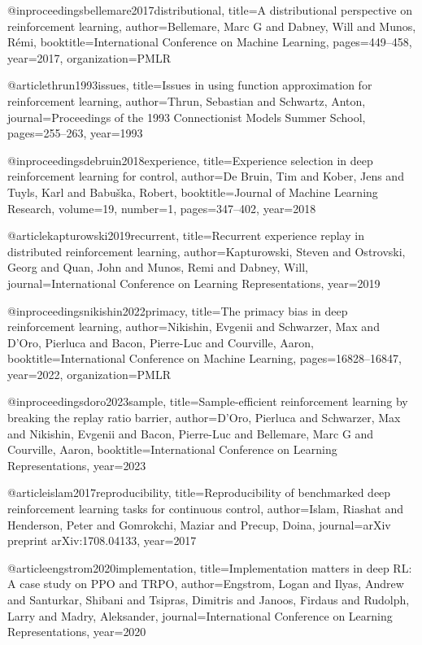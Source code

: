 @inproceedings{bellemare2017distributional,
  title={A distributional perspective on reinforcement learning},
  author={Bellemare, Marc G and Dabney, Will and Munos, R{\'e}mi},
  booktitle={International Conference on Machine Learning},
  pages={449--458},
  year={2017},
  organization={PMLR}
}

@article{thrun1993issues,
  title={Issues in using function approximation for reinforcement learning},
  author={Thrun, Sebastian and Schwartz, Anton},
  journal={Proceedings of the 1993 Connectionist Models Summer School},
  pages={255--263},
  year={1993}
}

@inproceedings{debruin2018experience,
  title={Experience selection in deep reinforcement learning for control},
  author={De Bruin, Tim and Kober, Jens and Tuyls, Karl and Babu{\v{s}}ka, Robert},
  booktitle={Journal of Machine Learning Research},
  volume={19},
  number={1},
  pages={347--402},
  year={2018}
}

@article{kapturowski2019recurrent,
  title={Recurrent experience replay in distributed reinforcement learning},
  author={Kapturowski, Steven and Ostrovski, Georg and Quan, John and Munos, Remi and Dabney, Will},
  journal={International Conference on Learning Representations},
  year={2019}
}

@inproceedings{nikishin2022primacy,
  title={The primacy bias in deep reinforcement learning},
  author={Nikishin, Evgenii and Schwarzer, Max and D'Oro, Pierluca and Bacon, Pierre-Luc and Courville, Aaron},
  booktitle={International Conference on Machine Learning},
  pages={16828--16847},
  year={2022},
  organization={PMLR}
}

@inproceedings{doro2023sample,
  title={Sample-efficient reinforcement learning by breaking the replay ratio barrier},
  author={D'Oro, Pierluca and Schwarzer, Max and Nikishin, Evgenii and Bacon, Pierre-Luc and Bellemare, Marc G and Courville, Aaron},
  booktitle={International Conference on Learning Representations},
  year={2023}
}

@article{islam2017reproducibility,
  title={Reproducibility of benchmarked deep reinforcement learning tasks for continuous control},
  author={Islam, Riashat and Henderson, Peter and Gomrokchi, Maziar and Precup, Doina},
  journal={arXiv preprint arXiv:1708.04133},
  year={2017}
}

@article{engstrom2020implementation,
  title={Implementation matters in deep RL: A case study on PPO and TRPO},
  author={Engstrom, Logan and Ilyas, Andrew and Santurkar, Shibani and Tsipras, Dimitris and Janoos, Firdaus and Rudolph, Larry and Madry, Aleksander},
  journal={International Conference on Learning Representations},
  year={2020}
}

